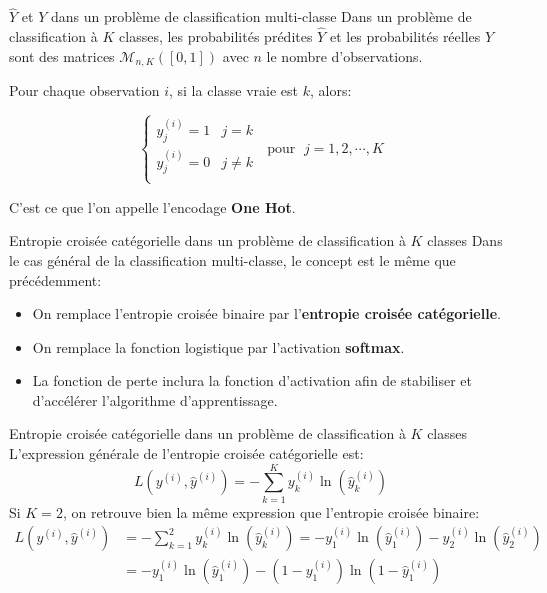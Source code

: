 \begin{frame}{$\hat{Y}$ et $Y$ dans un problème de classification multi-classe}
	Dans un problème de classification à $K$ classes, les probabilités prédites $\hat{Y}$ et les probabilités réelles $Y$ sont des matrices $\mathcal{M}_{n, K}([0, 1])$ avec $n$ le nombre d'observations.
	
	\pause
	\vspace{0.5cm}
	
	Pour chaque observation $i$, si la classe vraie est $k$, alors:
	
	\begin{equation*}
		\begin{cases}
			y_{j}^{(i)} = 1 & j = k \\
			y_{j}^{(i)} = 0 & j \ne k \\
		\end{cases} \; \text{ pour } \; j = 1, 2, \cdots, K
	\end{equation*}
	
	\vspace{0.5cm}
	
	C'est ce que l'on appelle l'encodage \textbf{One Hot}.
\end{frame}

\begin{frame}{Entropie croisée catégorielle dans un problème de classification à $K$ classes}
	Dans le cas général de la classification multi-classe, le concept est le même que précédemment:
	\begin{itemize}
		\item On remplace l'entropie croisée binaire par l'\textbf{entropie croisée catégorielle}.
		\pause
		\item On remplace la fonction logistique par l'activation \textbf{softmax}.
		\pause
		\item La fonction de perte inclura la fonction d'activation afin de stabiliser et d'accélérer l'algorithme d'apprentissage.
	\end{itemize}
\end{frame}

\begin{frame}{Entropie croisée catégorielle dans un problème de classification à $K$ classes}
	L'expression générale de l'entropie croisée catégorielle est:
	\begin{equation*}
		L\left(y^{(i)}, \hat{y}^{(i)}\right) = -\sum_{k=1}^K y_k^{(i)} \ln{\left(\hat{y}_k^{(i)}\right)}
	\end{equation*}
	\pause
	Si $K = 2$, on retrouve bien la même expression que l'entropie croisée binaire:
	\begin{equation*}
		\begin{aligned}
			L\left(y^{(i)}, \hat{y}^{(i)}\right) 
			&= -\sum_{k=1}^2 y_k^{(i)} \ln{\left(\hat{y}_k^{(i)}\right)}
			= - y_{1}^{(i)} \ln{\left(\hat{y}_{1}^{(i)}\right)} - y_{2}^{(i)} \ln{\left(\hat{y}_{2}^{(i)}\right)} \\
			&= - y_{1}^{(i)} \ln{\left(\hat{y}_{1}^{(i)}\right)} - \left(1 - y_{1}^{(i)}\right) \ln{\left(1 - \hat{y}_{1}^{(i)}\right)}
		\end{aligned}
	\end{equation*}
\end{frame}

